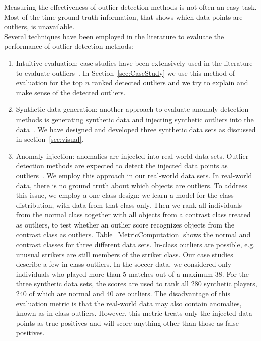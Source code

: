 {				Measuring the effectiveness of outlier detection methods is not often an easy task. Most of the time ground truth information, that shows which data points are outliers, is unavailable. \\
				Several techniques have been employed in the literature to evaluate the performance of outlier detection methods:
				\begin{enumerate}
					\item Intuitive evaluation: case studies have been extensively used in the literature to evaluate outliers~\citep{aggarwal2013}. In Section~\ref{sec:CaseStudy} we use this method of evaluation for the top $n$ ranked detected outliers and we try to explain and make sense of the detected outliers. 	
					\item Synthetic data generation: another approach to evaluate anomaly detection methods is generating synthetic data and injecting synthetic outliers into the data~\citep{aggarwal2013}. We have designed and developed three synthetic data sets as discussed in section~\ref{sec:visual}.
					\item Anomaly injection: anomalies are injected into real-world data sets. Outlier detection methods are expected to detect the injected data points as outliers~\citep{Akoglu2015}. We employ this approach in our real-world data sets.
						In real-world data, there is no ground truth about which objects are outliers. To address this issue, we employ a one-class design: we learn a model for the class distribution, with data from that class only. 
						Then we rank all individuals from the normal class together with all objects from a contrast class treated as outliers, to test whether an outlier score recognizes objects from the contrast class as outliers.
						Table~\ref{MetricComputation} shows the normal and contrast classes for three different data sets.  In-class outliers are possible, e.g. unusual strikers are still members of the striker class. Our case studies describe a few in-class outliers. In the soccer data, we considered only individuals who played more than 5 matches out of a maximum 38. For the three synthetic data sets, the scores are used to rank all 280 synthetic  players, 240 of which are normal and 40 are outliers.
					The disadvantage of this evaluation metric is that the real-world data may also contain anomalies, known as in-class outliers. However, this metric treats only the injected data points as true positives and will score anything other than those as false positives.
				\end{enumerate}
			
}
